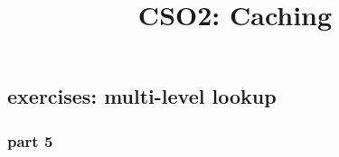 \date{}
\title{CSO2: Caching}
\date{}















% 



\subsection{exercises: multi-level lookup}
% 
% 
% 
% 
\subsubsection{part 5}




\begin{frame}
    \titlepage
\end{frame}



